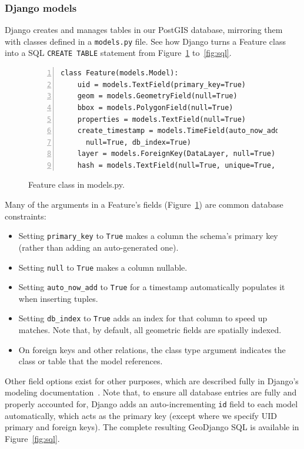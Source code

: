 \subsubsection{Django models}
Django creates and manages tables in our PostGIS database, mirroring them with classes defined in a \texttt{models.py} file. See how Django turns a Feature class into a SQL \texttt{CREATE TABLE} statement from Figure~\ref{fig:feature} to~\ref{fig:sql}.

\begin{figure}[ht]
\begin{Verbatim}[samepage=true,baselinestretch=1,numbers=left,xleftmargin=12mm]
class Feature(models.Model):
    uid = models.TextField(primary_key=True)
    geom = models.GeometryField(null=True)
    bbox = models.PolygonField(null=True)
    properties = models.TextField(null=True)
    create_timestamp = models.TimeField(auto_now_add=True,
      null=True, db_index=True)
    layer = models.ForeignKey(DataLayer, null=True)
    hash = models.TextField(null=True, unique=True, db_index=True)
\end{Verbatim}
\caption{Feature class in models.py.}
\label{fig:feature}
\end{figure}


Many of the arguments in a Feature's fields (Figure~\ref{fig:feature}) are common database constraints:
\begin{itemize}
\item Setting \texttt{primary\_key} to \texttt{True} makes a column the schema's primary key (rather than adding an auto-generated one).
\item Setting \texttt{null} to \texttt{True} makes a column nullable.
\item Setting \texttt{auto\_now\_add} to \texttt{True} for a timestamp automatically populates it when inserting tuples.
\item Setting \texttt{db\_index} to \texttt{True} adds an index for that column to speed up matches. Note that, by default, all geometric fields are spatially indexed.
\item On foreign keys and other relations, the class type argument indicates the class or table that the model references.
\end{itemize}

Other field options exist for other purposes, which are described fully in Django's modeling documentation~\cite{Models}.  Note that, to ensure all database entries are fully and properly accounted for, Django adds an auto-incrementing \texttt{id} field to each model automatically, which acts as the primary key (except where we specify UID primary and foreign keys). The complete resulting GeoDjango SQL is available in Figure~\ref{fig:sql}.

